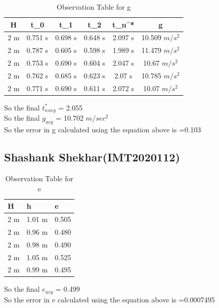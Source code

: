 \documentclass[11pt]{scrartcl} %
\begin{document}
\begin{table}[h]
\centering
\begin{tabular}{||c c c c c c||} 
\toprule
 \hline
 H & t_0 & t_1 & t_2 & t_n^* & g \\ [0.5ex] 
 \midrule
 \hline\hline
 2 m & 0.751 s & 0.698 s  & 0.648 s & 2.097 s & 10.509 $m/s^2$  \\ 
 \hline
 2 m & 0.787 s & 0.605 s & 0.598 s & 1.989 s & 11.479 $m/s^2$  \\
 \hline
 2 m & 0.753 s & 0.690 s & 0.604 s & 2.047 s  & 10.67 $m/s^2$   \\
 \hline
 2 m & 0.762 s & 0.685 s & 0.623 s & 2.07 s  & 10.785 $m/s^2$   \\
 \hline
 2 m & 0.771 s & 0.690 s & 0.611 s & 2.072 s  & 10.07 $m/s^2$  \\ [1ex]
 \bottomrule
 \hline
\end{tabular}
\caption{Observation Table for g}
\end{table}
So the final $t_n^*_{avg}$ = 2.055\\
So the final $g_{avg}$ = 10.702 $m/sec^2$\\
So the error in g calculated using the equation above is =0.103
\newpage
\subsection{Shashank Shekhar(IMT2020112)}

\begin{table}[h] %
	\centering %
	\begin{tabular}{l l l}
		\toprule
		\textbf{H} & \textbf{h} & \textbf{e} \\
		\midrule
		2 m & 1.01 m & 0.505\\
        2 m & 0.96 m  & 0.480\\
        2 m & 0.98 m  & 0.490\\
        2 m & 1.05 m & 0.525 \\
        2 m & 0.99 m & 0.495 \\
		\bottomrule
	\end{tabular}
	\caption{Observation Table for e}
\end{table}
So the final $e_{avg}$ = 0.499\\
So the error in e calculated using the equation above is =0.0007495
\end{document}
